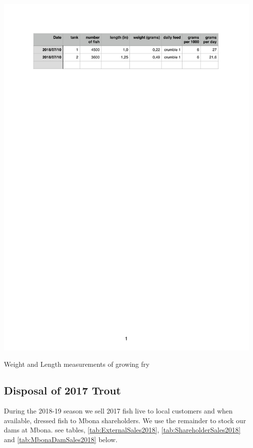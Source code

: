 \begin{table}[H]
  \centering
  \includegraphics[scale = 0.9]{tables/TablesFryGrowth.pdf}
   \caption{Weight and Length measurements of growing fry}
   \label{tab:FryGrowth}
\end{table}

\subsection{Disposal of 2017 Trout}

During the 2018-19 season we sell 2017 fish live to local customers and 
when available, dressed fish to Mbona shareholders. We use the remainder
to stock our dams at Mbona. see tables, \ref{tab:ExternalSales2018}, 
\ref{tab:ShareholderSales2018} and \ref{tab:MbonaDamSales2018} below.

